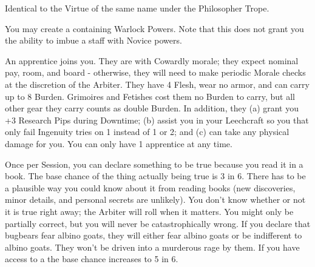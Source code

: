\begin{multicols*}{2}
Identical to the Virtue of the same name under the Philosopher Trope.


You may create a  containing Warlock Powers. Note that this does not grant you the ability to imbue a staff with Novice powers.


An apprentice joins you.  They are  with Cowardly morale; they expect nominal pay, room, and board - otherwise, they will need to make periodic Morale checks at the discretion of the Arbiter.  They have 4 Flesh, wear no armor, and can carry up to 8 Burden. Grimoires and Fetishes cost them no Burden to carry, but all other gear they carry counts as double Burden.  In addition, they (a) grant you +3 Research Pips during Downtime; (b) assist you in your Leechcraft so you that only fail Ingenuity tries on 1 instead of 1 or 2; and (c) can take any physical damage for you.  You can only have 1 apprentice at any time.

\newpage


Once per Session, you can declare something to be true because you read it in a book. The base chance of the thing actually being true is 3 in 6. There has to be a plausible way you could know about it from reading books (new discoveries, minor details, and personal secrets are unlikely). You don't know whether or not it is true right away; the Arbiter will roll when it matters. You might only be partially correct, but you will never be catastrophically wrong. If you declare that bugbears fear albino goats, they will either fear albino goats or be indifferent to albino goats. They won't be driven into a murderous rage by them. If you have access to a  the base chance increases to 5 in 6.

\cbreak




\end{multicols*}

